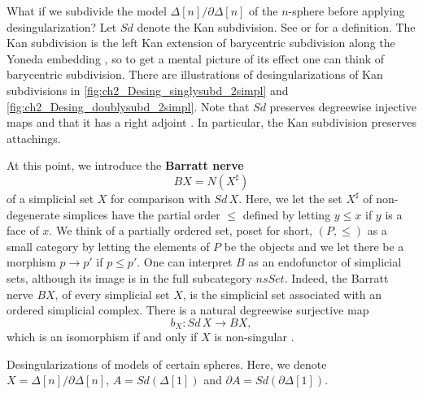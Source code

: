 What if we subdivide the model $\Delta [n]/\partial \Delta [n]$ of the $n$-sphere before applying desingularization? Let $Sd$ denote the Kan subdivision. See \cite[Def.~2.2.7]{WJR13} or \cite[p.~148]{FP90} for a definition. The Kan subdivision is the left Kan extension of barycentric subdivision along the Yoneda embedding \cite[p.~37]{WJR13}, so to get a mental picture of its effect one can think of barycentric subdivision. There are illustrations of desingularizations of Kan subdivisions in \cref{fig:ch2_Desing_singlysubd_2simpl} and \cref{fig:ch2_Desing_doublysubd_2simpl}. Note that $Sd$ preserves degreewise injective maps \cite[Cor.~4.2.9]{FP90} and that it has a right adjoint \cite[Prop.~4.2.10]{FP90}. In particular, the Kan subdivision preserves attachings.

At this point, we introduce the \textbf{Barratt nerve} \cite[Def.~2.2.3]{WJR13}
\[BX=N(X^\sharp )\]
of a simplicial set $X$ for comparison with $Sd\, X$. Here, we let the set $X^\sharp$ of non-degenerate simplices have the partial order $\leq$ defined by letting $y\leq x$ if $y$ is a face of $x$. We think of a partially ordered set, poset for short, $(P,\leq )$ as a small category by letting the elements of $P$ be the objects and we let there be a morphism $p\to p'$ if $p\leq p'$. One can interpret $B$ as an endofunctor of simplicial sets, although its image is in the full subcategory $nsSet$. Indeed, the Barratt nerve $BX$, of every simplicial set $X$, is the simplicial set associated with an ordered simplicial complex. There is \cite[p.~37]{WJR13} a natural degreewise surjective \cite[Lem.~2.2.10]{WJR13} map
\[b_X:Sd\, X\to BX,\]
which is an isomorphism if and only if $X$ is non-singular \cite[Lem.~2.2.11]{WJR13}.

\begin{table}
\centering
{}
\caption{Desingularizations of models of certain spheres. Here, we denote $X=\Delta [n]/\partial \Delta [n]$, $A=Sd(\Delta [1])$ and $\partial A=Sd(\partial \Delta [1])$.}
\label{tab:Desing_spherical_mod}
\end{table}

